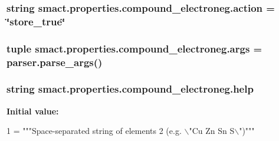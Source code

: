 \subsubsection[{action}]{\setlength{\rightskip}{0pt plus 5cm}string smact.\+properties.\+compound\+\_\+electroneg.\+action = \char`\"{}store\+\_\+true\char`\"{}}\label{namespacesmact_1_1properties_1_1compound__electroneg_aec2b007b9f27930ae06dcdd62b754ac1}
\hypertarget{namespacesmact_1_1properties_1_1compound__electroneg_a5e28515ab4ddcfbd0b4434b8670b8b02}{}
\subsubsection[{args}]{\setlength{\rightskip}{0pt plus 5cm}tuple smact.\+properties.\+compound\+\_\+electroneg.\+args = parser.\+parse\+\_\+args()}\label{namespacesmact_1_1properties_1_1compound__electroneg_a5e28515ab4ddcfbd0b4434b8670b8b02}
\hypertarget{namespacesmact_1_1properties_1_1compound__electroneg_a61c7d3b4c24942457f1caa1322fad39a}{}
\subsubsection[{help}]{\setlength{\rightskip}{0pt plus 5cm}string smact.\+properties.\+compound\+\_\+electroneg.\+help}\label{namespacesmact_1_1properties_1_1compound__electroneg_a61c7d3b4c24942457f1caa1322fad39a}
{\bfseries Initial value\+:}
\begin{DoxyCode}
1 = \textcolor{stringliteral}{"""Space-separated string of elements}
2 \textcolor{stringliteral}{                                (e.g. \(\backslash\)"Cu Zn Sn S\(\backslash\)")"""}
\end{DoxyCode}
\hypertarget{namespacesmact_1_1properties_1_1compound__electroneg_a37c9645aeda095ca168aab4473ffaf08}{}
